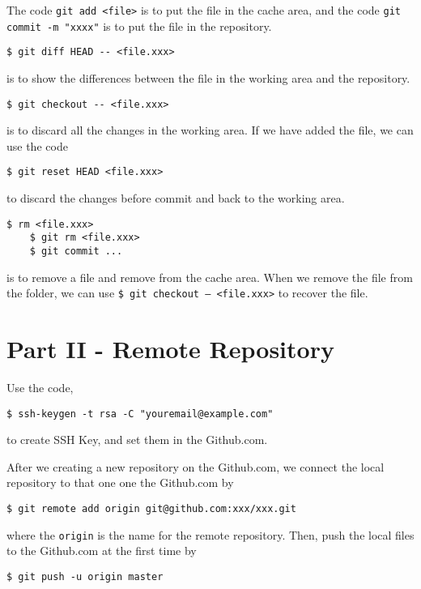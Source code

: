 \documentclass[11pt]{report}
\begin{document}
The code \texttt{git add <file>} is to put the file in the cache area, and the code \texttt{git commit -m "xxxx"} is to put the file in the repository.

\begin{lstlisting}[basicstyle=\small\conso]
    $ git diff HEAD -- <file.xxx>
\end{lstlisting}
is to show the differences between the file in the working area and the repository.

\begin{lstlisting}[basicstyle=\small\conso]
    $ git checkout -- <file.xxx>
\end{lstlisting}
is to discard all the changes in the working area. 
If we have added the file, we can use the code
\begin{lstlisting}[basicstyle=\small\conso]
    $ git reset HEAD <file.xxx>
\end{lstlisting}
to discard the changes before commit and back to the working area.

\begin{lstlisting}[basicstyle=\small\conso]
    $ rm <file.xxx>
    $ git rm <file.xxx>
    $ git commit ...
\end{lstlisting}
is to remove a file and remove from the cache area. 
When we remove the file from the folder, we can use \texttt{\$ git checkout -- <file.xxx>} to recover the file.

\section{Part II - Remote Repository}
Use the code,
\begin{lstlisting}[basicstyle=\small\conso]
    $ ssh-keygen -t rsa -C "youremail@example.com"
\end{lstlisting}
to create SSH Key, and set them in the Github.com.

After we creating a new repository on the Github.com, we connect the local repository to that one one the Github.com by 
\begin{lstlisting}[basicstyle=\small\conso]
    $ git remote add origin git@github.com:xxx/xxx.git
\end{lstlisting}
where the \texttt{origin} is the name for the remote repository.
Then, push the local files to the Github.com at the first time by 
\begin{lstlisting}[basicstyle=\small\conso]
    $ git push -u origin master
\end{lstlisting}
\end{document}
